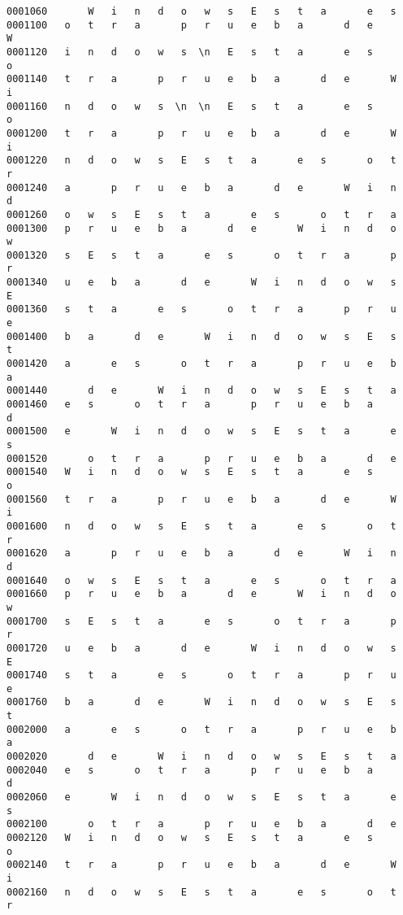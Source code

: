 \documentclass[a4paper,11pt]{article}
\begin{document}
\begin{itemize}
\begin{verbatim}
0001060       W   i   n   d   o   w   s   E   s   t   a       e   s    
0001100   o   t   r   a       p   r   u   e   b   a       d   e       W
0001120   i   n   d   o   w   s  \n   E   s   t   a       e   s       o
0001140   t   r   a       p   r   u   e   b   a       d   e       W   i
0001160   n   d   o   w   s  \n  \n   E   s   t   a       e   s       o
0001200   t   r   a       p   r   u   e   b   a       d   e       W   i
0001220   n   d   o   w   s   E   s   t   a       e   s       o   t   r
0001240   a       p   r   u   e   b   a       d   e       W   i   n   d
0001260   o   w   s   E   s   t   a       e   s       o   t   r   a    
0001300   p   r   u   e   b   a       d   e       W   i   n   d   o   w
0001320   s   E   s   t   a       e   s       o   t   r   a       p   r
0001340   u   e   b   a       d   e       W   i   n   d   o   w   s   E
0001360   s   t   a       e   s       o   t   r   a       p   r   u   e
0001400   b   a       d   e       W   i   n   d   o   w   s   E   s   t
0001420   a       e   s       o   t   r   a       p   r   u   e   b   a
0001440       d   e       W   i   n   d   o   w   s   E   s   t   a    
0001460   e   s       o   t   r   a       p   r   u   e   b   a       d
0001500   e       W   i   n   d   o   w   s   E   s   t   a       e   s
0001520       o   t   r   a       p   r   u   e   b   a       d   e    
0001540   W   i   n   d   o   w   s   E   s   t   a       e   s       o
0001560   t   r   a       p   r   u   e   b   a       d   e       W   i
0001600   n   d   o   w   s   E   s   t   a       e   s       o   t   r
0001620   a       p   r   u   e   b   a       d   e       W   i   n   d
0001640   o   w   s   E   s   t   a       e   s       o   t   r   a    
0001660   p   r   u   e   b   a       d   e       W   i   n   d   o   w
0001700   s   E   s   t   a       e   s       o   t   r   a       p   r
0001720   u   e   b   a       d   e       W   i   n   d   o   w   s   E
0001740   s   t   a       e   s       o   t   r   a       p   r   u   e
0001760   b   a       d   e       W   i   n   d   o   w   s   E   s   t
0002000   a       e   s       o   t   r   a       p   r   u   e   b   a
0002020       d   e       W   i   n   d   o   w   s   E   s   t   a    
0002040   e   s       o   t   r   a       p   r   u   e   b   a       d
0002060   e       W   i   n   d   o   w   s   E   s   t   a       e   s
0002100       o   t   r   a       p   r   u   e   b   a       d   e    
0002120   W   i   n   d   o   w   s   E   s   t   a       e   s       o
0002140   t   r   a       p   r   u   e   b   a       d   e       W   i
0002160   n   d   o   w   s   E   s   t   a       e   s       o   t   r

\end{verbatim}
\end{itemize}
\end{document}
